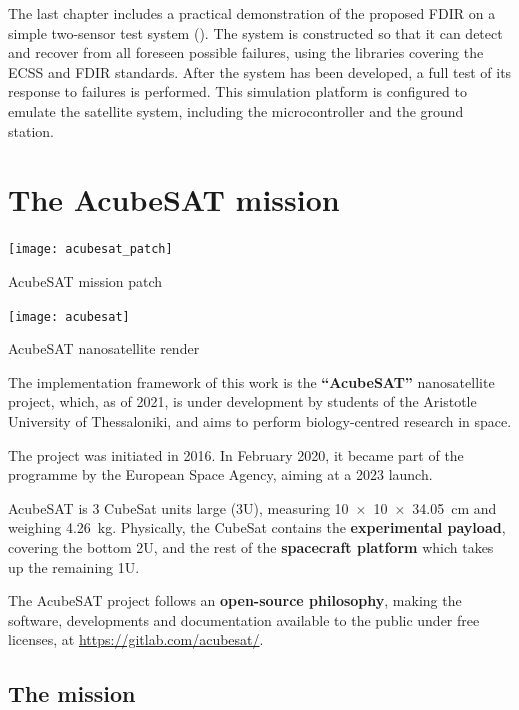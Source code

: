 \documentclass[a4paper,nobib]{tufte-book}
\begin{document}
The last chapter includes a practical demonstration of the proposed \acs{FDIR} on a simple two-sensor test system (). The system is constructed so that it can detect and recover from all foreseen possible failures, using the libraries covering the \acs{ECSS} and \acs{FDIR} standards. After the system has been developed, a full test of its response to failures is performed. This simulation platform is configured to emulate the satellite system, including the microcontroller and the ground station.

\chapter{The AcubeSAT mission}
\label{cap:acubesat}

\begin{marginfigure}
    \texttt{[image: acubesat\_patch]}
    \caption{AcubeSAT mission patch}
\end{marginfigure}

\begin{marginfigure}
    \centering
    \texttt{[image: acubesat]}
    \caption{AcubeSAT nanosatellite render}
\end{marginfigure}


The implementation framework of this work is the \textbf{``AcubeSAT''} nanosatellite project, which, as of 2021, is under development by students of the Aristotle University of Thessaloniki, and aims to perform biology-centred research in space.

The project was initiated in 2016. In February 2020, it became part of the  programme by the European Space Agency, aiming at a 2023 launch.

AcubeSAT is 3 CubeSat units large (3U), measuring \SI[product-units = single]{10 x 10 x 34.05}{\centi\metre} and weighing \SI{4.26}{\kilo\gram}. Physically, the CubeSat contains the \textbf{experimental payload}, covering the bottom 2U, and the rest of the \textbf{spacecraft platform} which takes up the remaining 1U.

The AcubeSAT project follows an \textbf{open-source philosophy}, making the software, developments and documentation available to the public under free licenses, at \url{https://gitlab.com/acubesat/}.

\section{The mission}
\end{document}
